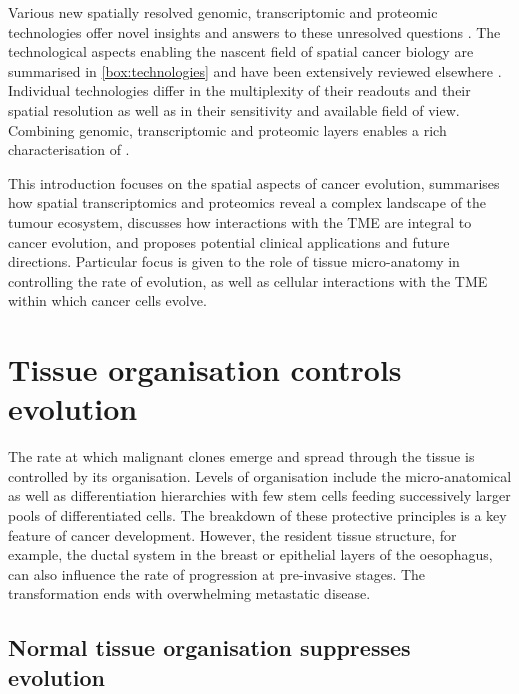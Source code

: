 Various new spatially resolved genomic, transcriptomic and proteomic technologies offer novel insights and answers to these unresolved questions . The technological aspects enabling the nascent field of spatial cancer biology are summarised in \cref{box:technologies} and have been extensively reviewed elsewhere \parencite{Lewis2021-ic}. Individual technologies differ in the multiplexity of their readouts and their spatial resolution as well as in their sensitivity and available field of view. Combining genomic, transcriptomic and proteomic layers enables a rich characterisation of .

This introduction focuses on the spatial aspects of cancer evolution, summarises how spatial transcriptomics and proteomics reveal a complex landscape of the tumour ecosystem, discusses how interactions with the \ac{TME} are integral to cancer evolution, and proposes potential clinical applications and future directions. Particular focus is given to the role of tissue micro-anatomy in controlling the rate of evolution, as well as cellular interactions with the \ac{TME} within which cancer cells evolve.

\section{Tissue organisation controls evolution}
\label{sec:intro-tissue-organisation}

The rate at which malignant clones emerge and spread through the tissue is controlled by its organisation. Levels of organisation include the micro-anatomical  as well as differentiation hierarchies with few stem cells feeding successively larger pools of differentiated cells. The breakdown of these protective principles is a key feature of cancer development. However, the resident tissue structure, for example, the ductal system in the breast or epithelial layers of the oesophagus, can also influence the rate of progression at pre-invasive stages. The transformation ends with overwhelming metastatic disease.

\subsection*{Normal tissue organisation suppresses evolution}

